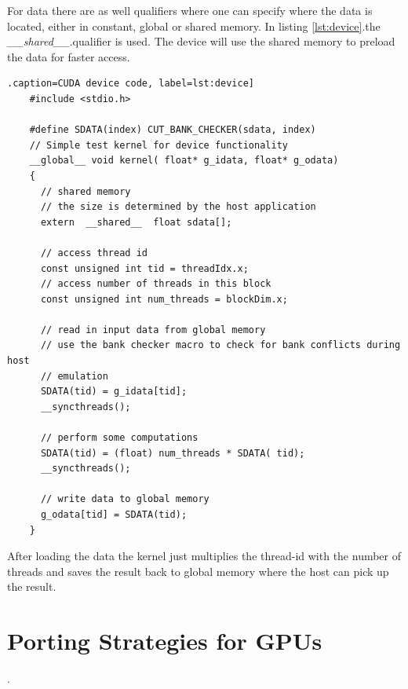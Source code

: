 For data there are as well qualifiers where one can specify where the data is
located, either in constant, global or shared memory. In listing
\autoref{lst:device}.the \textit{\_\_shared\_\_}.qualifier is used. The device will
use the shared memory to preload the data for faster access.


\begin{lstlisting}.caption=CUDA device code, label=lst:device]
	#include <stdio.h>

	#define SDATA(index) CUT_BANK_CHECKER(sdata, index)
	// Simple test kernel for device functionality
	__global__ void kernel( float* g_idata, float* g_odata) 
	{
	  // shared memory
	  // the size is determined by the host application
	  extern  __shared__  float sdata[];

	  // access thread id
	  const unsigned int tid = threadIdx.x;
	  // access number of threads in this block
	  const unsigned int num_threads = blockDim.x;

	  // read in input data from global memory
	  // use the bank checker macro to check for bank conflicts during host
	  // emulation
	  SDATA(tid) = g_idata[tid];
	  __syncthreads();

	  // perform some computations
	  SDATA(tid) = (float) num_threads * SDATA( tid);
	  __syncthreads();

	  // write data to global memory
	  g_odata[tid] = SDATA(tid);
	} 

\end{lstlisting} 


After loading the data the kernel just multiplies the thread-id with the number
of threads and saves the result back to global memory where the host can pick up
the result.


\section{Porting Strategies for GPUs}.%
\label{sec:porting_strategies_for_gpu} 
